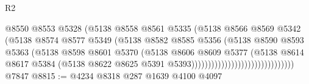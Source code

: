 \begin{lexlean}{R2}
\begin{coremodule}
                                                @8550
                                                @8553
                                                @5328
                                                (@5138
                                                  @8558
                                                  @8561
                                                  @5335
                                                  (@5138
                                                    @8566
                                                    @8569
                                                    @5342
                                                    (@5138
                                                      @8574
                                                      @8577
                                                      @5349
                                                      (@5138
                                                        @8582
                                                        @8585
                                                        @5356
                                                        (@5138
                                                          @8590
                                                          @8593
                                                          @5363
                                                          (@5138
                                                            @8598
                                                            @8601
                                                            @5370
                                                            (@5138
                                                              @8606
                                                              @8609
                                                              @5377
                                                              (@5138
                                                                @8614
                                                                @8617
                                                                @5384
                                                                (@5138
                                                                  @8622
                                                                  @8625
                                                                  @5391
                                                                  @5393)))))))))))))))))))))))))))))))
    @7847
@8815 := @4234 @8318 @287 @1639 @4100 @4097

\end{coremodule}
\end{lexlean}
